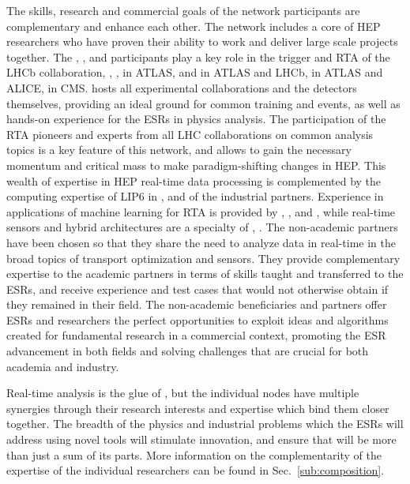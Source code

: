 The skills, research and commercial goals of the network participants are
complementary and enhance each other. The \acronym network includes a core of HEP researchers who have proven their ability to work
and deliver large scale projects together. 
The \cnrsentity, \dortmundentity, \santiagoentity and \cincinnatientity participants play a key role in the trigger
and RTA of the LHCb collaboration, 
\ohioentity, \pisaentity, \oregonentity in ATLAS, \nikhef and \heidelbergentity in ATLAS and LHCb, 
\lundentity in ATLAS and ALICE, \helsinkientity in CMS.
\cernentity hosts all experimental collaborations and the detectors themselves,
providing an ideal ground for common training and events, as well as hands-on
experience for the ESRs in physics analysis. 
The participation of the RTA pioneers and experts from all LHC collaborations on 
common analysis topics is a key feature of this network, and allows to gain
the necessary momentum and critical mass to make paradigm-shifting changes in HEP. 
This wealth of expertise in HEP real-time data processing
is complemented by the computing expertise of LIP6 in \cnrsentity, \cincinnatientity
and of the industrial partners.  
Experience in applications of machine learning for RTA
is provided by \ibmentity, \fleetmaticsentity,
\ximantisentity and \dqentity, while real-time sensors and hybrid architectures
are a specialty of \lightboxentity, \cathientity \heidelberginstrumentsentity. 
The non-academic partners have been chosen so that they share the need to analyze data
in real-time in the broad topics of transport optimization and sensors.
They provide complementary expertise to the academic partners in terms of skills taught and
transferred to the ESRs, and receive experience and test cases that would not otherwise
obtain if they remained in their field. 
The non-academic beneficiaries and partners
offer ESRs and researchers the perfect opportunities to exploit
ideas and algorithms created for fundamental research in a commercial context, promoting the ESR 
advancement in both fields and solving challenges that are crucial for both academia and industry. 

Real-time analysis is the glue of \acronym, but the individual nodes have multiple synergies through their research
interests and expertise which bind them closer together. The breadth
of the physics and industrial problems which the ESRs will address using novel tools will
stimulate innovation, %
and ensure that \acronym will
be more than just a sum of its parts. More information on the complementarity of the expertise of the
individual researchers can be found in Sec.~\ref{sub:composition}. 

